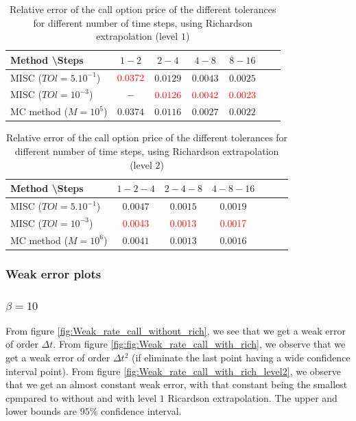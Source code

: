 \documentclass[11pt]{article}
\begin{document}
\begin{table}[h!]
	\centering
	\begin{tabular}{l*{5}{c}r}
		Method \textbackslash  Steps    &$1-2$        & $2-4$ & $4-8$ & $8-16$  \\
		\hline
		MISC ($TOl=5.10^{-1}$)  &${\color{red}0.0372}$ & $ 0.0129$ & $0.0043$ & $ 0.0025$  \\
		MISC ($TOl=10^{-3}$) & $-$ & $ {\color{red}0.0126}$ & ${\color{red}    0.0042}$ & ${\color{red}0.0023}$   \\
		MC method ($M=10^{5}$)&$ \mathbf{0.0374}$    & $\mathbf{0.0116}$  & $\mathbf{0.0027}$  & $\mathbf{0.0022}$ \\
		\hline
	\end{tabular}
	\caption{Relative error of the call option price of the different tolerances for different number of time steps, using Richardson extrapolation (level $1$)}
	\label{Relative error of Call option price of the different tolerances for different number of time steps, using Richardson extrapolation (level $1$)}
\end{table}


\begin{table}[h!]
	\centering
	\begin{tabular}{l*{5}{c}r}
		Method \textbackslash  Steps    &$1-2-4$        & $2-4-8$ & $4-8-16$   \\
		\hline
		MISC ($TOl=5.10^{-1}$)  &$0.0047$ & $  0.0015$ & $0.0019
		$   \\
		MISC ($TOl=10^{-3}$) & $ {\color{red}0.0043}$ & $ {\color{red}0.0013}$ & ${\color{red}  0.0017}$    \\
		MC method ($M=10^{6}$)&$ \mathbf{0.0041}$    & $\mathbf{0.0013}$  & $\mathbf{0.0016}$  \\
		\hline
	\end{tabular}
	\caption{Relative error of the call option price of the different tolerances for different number of time steps, using Richardson extrapolation (level $2$)}
	\label{Relative error of Call option price of the different tolerances for different number of time steps, using Richardson extrapolation (level $2$)}
\end{table}
\newpage
\subsubsection{Weak error plots} \label{sec:Weak error plots_call}
\subsubsection*{$\beta=10$}
From figure \ref{fig:Weak_rate_call_without_rich}, we see that we get a weak error of order $\Delta t$. From figure \ref{fig:fig:Weak_rate_call_with_rich}, we observe that we get a weak error of order $\Delta t^2$ (if eliminate the  last point having a wide confidence interval point). From figure \ref{fig:Weak_rate_call_with_rich_level2}, we observe that we get an almost constant weak error, with that constant being the smallest cpmpared to without and with level $1$ Ricardson extrapolation. The upper and lower bounds are $95\%$ confidence interval.
\end{document}
